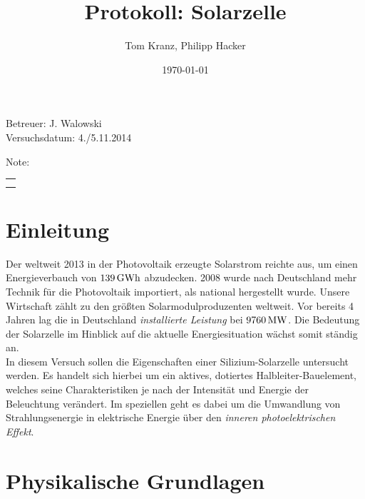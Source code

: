 \documentclass[numbers=noenddot,12pt,a4paper]{scrartcl}
\title{Protokoll: Solarzelle}
\author{Tom Kranz, Philipp Hacker}
\date{\today}
\newcommand{\tilt}[1]{\textit{#1}}
\begin{document}
\maketitle
\begin{center}
Betreuer: J. Walowski\\
Versuchsdatum: 4./5.11.2014\\
\begin{table}[h]
\centering
Note:
\begin{tabularx}{1.5cm}{|X|}
\hline \\ \\
\hline
\end{tabularx}
\end{table}
\end{center}
\vspace*{\fill}
\tableofcontents
\vfill
\newpage
\section{Einleitung}
Der weltweit 2013 in der Photovoltaik erzeugte Solarstrom reichte aus, um einen Energieverbauch von $\unit[139]{GWh}$ abzudecken. 2008 wurde nach Deutschland mehr Technik für die Photovoltaik importiert, als national hergestellt wurde. Unsere Wirtschaft zählt zu den größten Solarmodulproduzenten weltweit. Vor bereits 4 Jahren lag die in Deutschland \tilt{installierte Leistung} bei $\unit[9760]{MW}$. Die Bedeutung der Solarzelle im Hinblick auf die aktuelle Energiesituation wächst somit ständig an. \\
In diesem Versuch sollen die Eigenschaften einer Silizium-Solarzelle untersucht werden. Es handelt sich hierbei um ein aktives, dotiertes Halbleiter-Bauelement, welches seine Charakteristiken je nach der Intensität und Energie der Beleuchtung verändert. Im speziellen geht es dabei um die Umwandlung von Strahlungsenergie in elektrische Energie über den \tilt{inneren photoelektrischen Effekt}.
\section{Physikalische Grundlagen}
\end{document}
